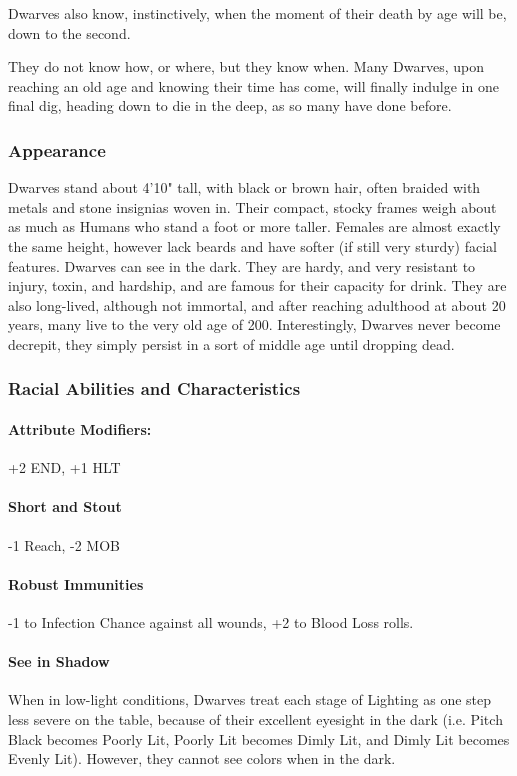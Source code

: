 \documentclass[oneside,11pt,english]{book}
\begin{document}
 
Dwarves also know, instinctively, when the moment of their death by age will be, down to the second. 


They do not know how, or where, but they know when. Many Dwarves, upon reaching an old age and 
knowing their time has come, will finally indulge in one final dig, heading down to die in the deep, as so 
many have done before. 
\subsubsection*{Appearance} 
Dwarves stand about 4'10" tall, with black or brown hair, often braided with metals and stone insignias 
woven in. Their compact, stocky frames weigh about as much as Humans who stand a foot or more taller. 
Females are almost exactly the same height, however lack beards and have softer (if still very sturdy) 
facial features. Dwarves can see in the dark. They are hardy, and very resistant to injury, toxin, and 
hardship, and are famous for their capacity for drink. They are also long-lived, although not immortal, and 
after reaching adulthood at about 20 years, many live to the very old age of 200. Interestingly, Dwarves 
never become decrepit, they simply persist in a sort of middle age until dropping dead. 
\subsubsection*{Racial Abilities and Characteristics} 
\paragraph{Attribute Modifiers:} +2 END, +1 HLT 
\paragraph{Short and Stout}
-1 Reach, -2 MOB 
\paragraph{Robust Immunities}
-1 to Infection Chance against all wounds, +2 to Blood Loss rolls. 
\paragraph{See in Shadow}
When in low-light conditions, Dwarves treat each stage of Lighting as one step less severe on the 
table, because of their excellent eyesight in the dark (i.e. Pitch Black becomes Poorly Lit, Poorly 
Lit becomes Dimly Lit, and Dimly Lit becomes Evenly Lit). However, they cannot see colors 
when in the dark. 
\end{document}
